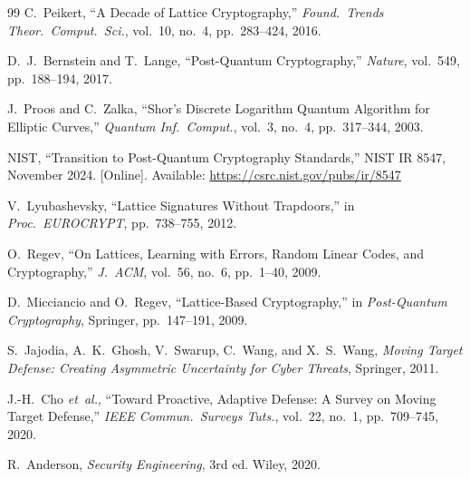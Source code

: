 \documentclass[12pt, a4paper, twocolumn]{article}
\begin{document}
\begin{thebibliography}{99}
C.~Peikert, ``A Decade of Lattice Cryptography,'' \textit{Found.\ Trends Theor.\ Comput.\ Sci.}, vol.~10, no.~4, pp.~283--424, 2016.

D.~J.~Bernstein and T.~Lange, ``Post-Quantum Cryptography,'' \textit{Nature}, vol.~549, pp.~188--194, 2017.

J.~Proos and C.~Zalka, ``Shor's Discrete Logarithm Quantum Algorithm for Elliptic Curves,'' \textit{Quantum Inf.\ Comput.}, vol.~3, no.~4, pp.~317--344, 2003.

NIST, ``Transition to Post-Quantum Cryptography Standards,'' NIST IR 8547, November 2024. [Online]. Available: \url{https://csrc.nist.gov/pubs/ir/8547}

V.~Lyubashevsky, ``Lattice Signatures Without Trapdoors,'' in \textit{Proc.\ EUROCRYPT}, pp.~738--755, 2012.

O.~Regev, ``On Lattices, Learning with Errors, Random Linear Codes, and Cryptography,'' \textit{J.\ ACM}, vol.~56, no.~6, pp.~1--40, 2009.

D.~Micciancio and O.~Regev, ``Lattice-Based Cryptography,'' in \textit{Post-Quantum Cryptography}, Springer, pp.~147--191, 2009.

S.~Jajodia, A.~K.~Ghosh, V.~Swarup, C.~Wang, and X.~S.~Wang, \textit{Moving Target Defense: Creating Asymmetric Uncertainty for Cyber Threats}, Springer, 2011.

J.-H.~Cho \textit{et~al.}, ``Toward Proactive, Adaptive Defense: A Survey on Moving Target Defense,'' \textit{IEEE Commun.\ Surveys Tuts.}, vol.~22, no.~1, pp.~709--745, 2020.

R.~Anderson, \textit{Security Engineering}, 3rd ed. Wiley, 2020.

\end{thebibliography}
\end{document}

